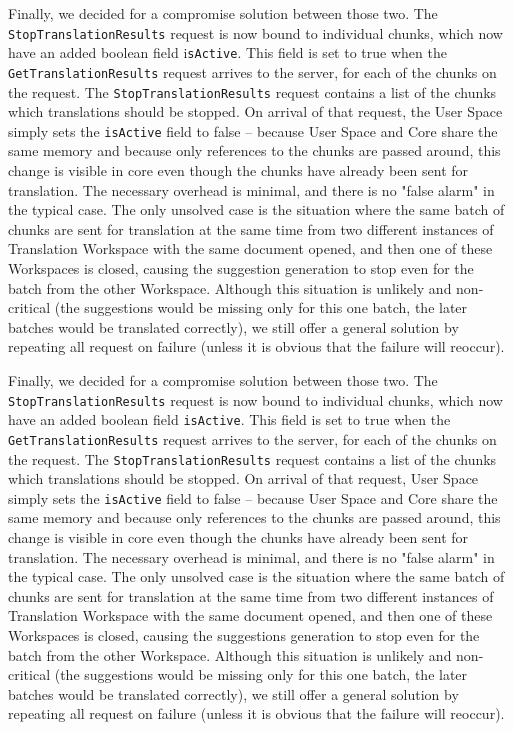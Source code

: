 {Finally, we decided for a compromise solution between those two. The {\tt StopTranslationResults} request is now bound to individual chunks, which now have an added boolean field i{\tt sActive}. This field is set to true when the {\tt GetTranslationResults} request arrives to the server, for each of the chunks on the request. The {\tt StopTranslationResults} request contains a list of the chunks which translations should be stopped. On arrival of that request, the User Space simply sets the {\tt isActive} field to false -- because User Space and Core share the same memory and because only references to the chunks are passed around, this change is visible in core even though the chunks have already been sent for translation. The necessary overhead is minimal, and there is no "false alarm" in the typical case. The only unsolved case is the situation where the same batch of chunks are sent for translation at the same time from two different instances of Translation Workspace with the same document opened, and then one of these Workspaces is closed, causing the suggestion generation to stop even for the batch from the other Workspace. Although this situation is unlikely and non-critical (the suggestions would be missing only for this one batch, the later batches would be translated correctly), we still offer a general solution by repeating all request on failure (unless it is obvious that the failure will reoccur).

Finally, we decided for a compromise solution between those two. The {\tt StopTranslationResults} request is now bound to individual chunks, which now have an added boolean field {\tt isActive}. This field is set to true when the {\tt GetTranslationResults} request arrives to the server, for each of the chunks on the request. The {\tt StopTranslationResults} request contains a list of the chunks which translations should be stopped. On arrival of that request, User Space simply sets the {\tt isActive} field to false -- because User Space and Core share the same memory and because only references to the chunks are passed around, this change is visible in core even though the chunks have already been sent for translation. The necessary overhead is minimal, and there is no "false alarm" in the typical case. The only unsolved case is the situation where the same batch of chunks are sent for translation at the same time from two different instances of Translation Workspace with the same document opened, and then one of these Workspaces is closed, causing the suggestions generation to stop even for the batch from the other Workspace. Although this situation is unlikely and non-critical (the suggestions would be missing only for this one batch, the later batches would be translated correctly), we still offer a general solution by repeating all request on failure (unless it is obvious that the failure will reoccur).

}
